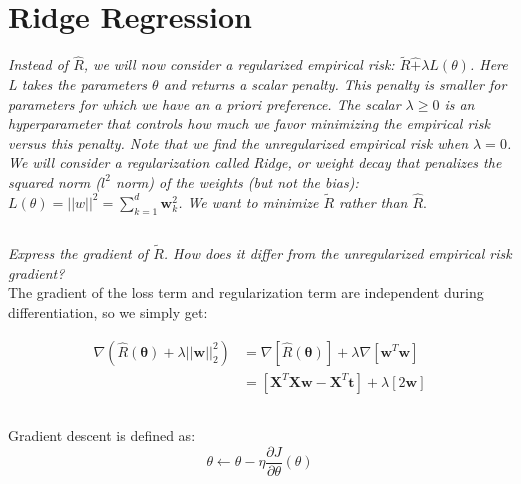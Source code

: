 \documentclass[reqno]{amsart}
\theoremstyle{definition}
\theoremstyle{remark}
\numberwithin{equation}{section}
\begin{document}
\section{Ridge Regression}
\textit{Instead of $\hat{R}$, we will now consider a regularized empirical risk: $\widetilde{R}\hat+\lambda L(\theta)$. Here L takes the parameters $\theta$ and returns a scalar penalty. This penalty is smaller for parameters for which we have an a priori preference. The scalar $\lambda \geq 0$ is an hyperparameter that controls how much we favor minimizing the empirical risk versus this penalty. Note that we find the unregularized empirical risk when $\lambda = 0$. We will consider a regularization called Ridge, or weight decay that penalizes the squared norm ($l^2$ norm) of the weights (but not the bias): $L(\theta) = ||w||^2 = \sum_{k=1}^{d}\mathbf{w}_k^2$. We want to minimize $\widetilde{R}$ rather than $\hat{R}$}.

\subsection{}
\textit{Express the gradient of $\widetilde{R}$. How does it differ from the unregularized empirical risk gradient?} \\

The gradient of the loss term and regularization term are independent during differentiation, so we simply get:

\begin{align}
    \nabla(\hat{R}(\mathbf{\theta}) + \lambda ||\mathbf{w}||^2_2) &=  
        \nabla[\hat{R}(\mathbf{\theta})]+ \lambda \nabla[\mathbf{w}^T\mathbf{w}] \\
    &= [\mathbf{X}^T\mathbf{Xw}-\mathbf{X}^T\mathbf{t}] + \lambda[2\mathbf{w}]
\end{align}

\subsection{}

Gradient descent is defined as: \\

\begin{equation}
    \theta \leftarrow \theta - \eta \frac{\partial{J}}{\partial{\theta}}(\theta)
\end{equation}
\end{document}
